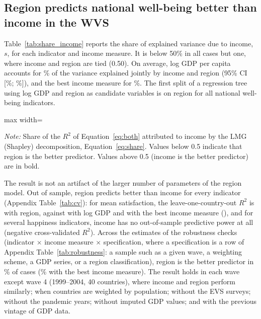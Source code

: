 \documentclass[12pt]{article}
\begin{document}
\subsection{Region predicts national well-being better than income in the WVS}\label{subsec:region_wvs}

Table~\ref{tab:share_income} reports the share of explained variance due to income, $s$, for each indicator and income measure. It is below 50\% in all cases but one, where income and region are tied (0.50). On average, log GDP per capita accounts for \meanShareIncomePPP\% of the variance explained jointly by income and region (95\% CI [\ciLowWVSMeanShare\%; \ciHighWVSMeanShare\%]), and the best income measure for \meanShareIncomeBest\%. The first split of a regression tree using log GDP and region as candidate variables is on region for all national well-being indicators.

\begin{table}[htbp]
    \centering
    \caption{Share of explained variance due to income rather than region (LMG), WVS/EVS 1981--2023.}\label{tab:share_income}
    \begin{adjustbox}{max width=\textwidth}
    
    \end{adjustbox}
    \begin{minipage}{\textwidth}\footnotesize \textit{Note:} Share of the $R^2$ of Equation~\eqref{eq:both} attributed to income by the LMG (Shapley) decomposition, Equation~\eqref{eq:share}. Values below 0.5 indicate that region is the better predictor. Values above 0.5 (income is the better predictor) are in bold.\end{minipage}
\end{table}

The result is not an artifact of the larger number of parameters of the region model. Out of sample, region predicts better than income for every indicator (Appendix Table~\ref{tab:cv}): for mean satisfaction, the leave-one-country-out $R^2$ is \cvRegionSatisfiedMean with region, against \cvIncomeSatisfiedMean with log GDP and \cvIncomeBestSatisfiedMean with the best income measure (\bestIncome), and for several happiness indicators, income has no out-of-sample predictive power at all (negative cross-validated $R^2$). Across the \nSpecsWVS estimates of the robustness checks (indicator $\times$ income measure $\times$ specification, where a specification is a row of Appendix Table~\ref{tab:robustness}: a sample such as a given wave, a weighting scheme, a GDP series, or a region classification), region is the better predictor in \shareRegionBetterWVS\% of cases (\shareRegionBetterWVSbest\% with the best income measure). The result holds in each wave except wave 4 (1999--2004, 40 countries), where income and region perform similarly; when countries are weighted by population; without the EVS surveys; without the pandemic years; without imputed GDP values; and with the previous vintage of GDP data.
\end{document}
